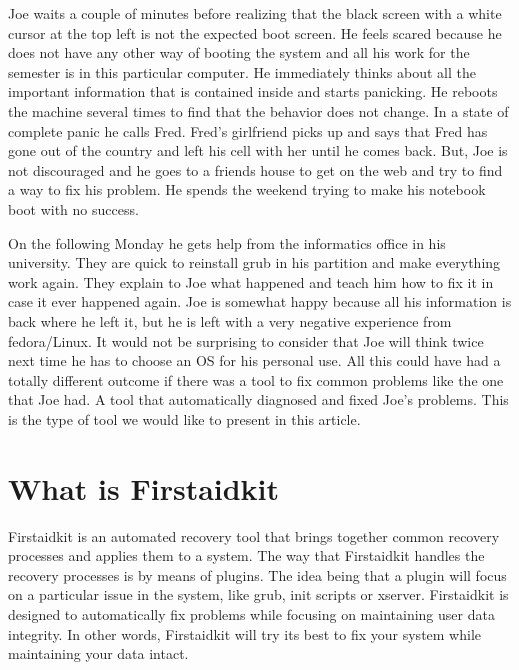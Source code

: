 \documentclass[a4paper,13pt]{article}
\begin{document}
Joe waits a couple of minutes before realizing that the black screen with a white cursor at the top left is not the expected boot screen.  He feels scared because he does not have any other way of booting the system and all his work for the semester is in this particular computer.  He immediately thinks about all the important information that is contained inside and starts panicking.  He reboots the machine several times to find that the behavior does not change.  In a state of complete panic he calls Fred.  Fred's girlfriend picks up and says that Fred has gone out of the country and left his cell with her until he comes back.  But, Joe is not discouraged and he goes to a friends house to get on the web and try to find a way to fix his problem.  He spends the weekend trying to make his notebook boot with no success.

On the following Monday he gets help from the informatics office in his university.  They are quick to reinstall grub in his partition and make everything work again.  They explain to Joe what happened and teach him how to fix it in case it ever happened again.  Joe is somewhat happy because all his information is back where he left it, but he is left with a very negative experience from fedora/Linux.  It would not be surprising to consider that Joe will think twice next time he has to choose an OS for his personal use.  All this could have had a totally different outcome if there was a tool to fix common problems like the one that Joe had.  A tool that automatically diagnosed and fixed Joe's problems.  This is the type of tool we would like to present in this article.

\section{What is Firstaidkit}
Firstaidkit is an automated recovery tool that brings together common recovery processes and applies them to a system.  The way that Firstaidkit handles the recovery processes is by means of plugins.  The idea being that a plugin will focus on a particular issue in the system, like grub, init scripts or xserver.  Firstaidkit is designed to automatically fix problems while focusing on maintaining user data integrity.  In other words, Firstaidkit will try its best to fix your system while maintaining your data intact.
\end{document}
